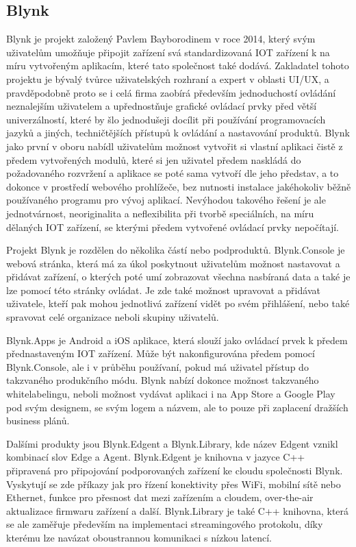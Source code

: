 \subsection{Blynk}

Blynk je projekt založený Pavlem Bayborodinem v roce 2014, který svým uživatelům umožňuje připojit zařízení svá standardizovaná IOT zařízení k na míru vytvořeným aplikacím, které tato společnost také dodává. Zakladatel tohoto projektu je bývalý tvůrce uživatelských rozhraní a expert v oblasti UI/UX, a pravděpodobně proto se i celá firma zaobírá především jednoduchostí ovládání neznalejším uživatelem a upřednostňuje grafické ovládací prvky před větší univerzálností, které by šlo jednodušeji docílit při používání programovacích jazyků a jiných, techničtějších přístupů k ovládání a nastavování produktů. Blynk jako první v oboru nabídl uživatelům možnost vytvořit si vlastní aplikaci čistě z předem vytvořených modulů, které si jen uživatel předem naskládá do požadovaného rozvržení a aplikace se poté sama vytvoří dle jeho představ, a to dokonce v prostředí webového prohlížeče, bez nutnosti instalace jakéhokoliv běžně používaného programu pro vývoj aplikací. Nevýhodou takového řešení je ale jednotvárnost, neoriginalita a neflexibilita při tvorbě speciálních, na míru dělaných IOT zařízení, se kterými předem vytvořené ovládací prvky nepočítají.

Projekt Blynk je rozdělen do několika částí nebo podproduktů. Blynk.Console je webová stránka, která má za úkol poskytnout uživatelům možnost nastavovat a přidávat zařízení, o kterých poté umí zobrazovat všechna nasbíraná data a také je lze pomocí této stránky ovládat. Je zde také možnost upravovat a přidávat uživatele, kteří pak mohou jednotlivá zařízení vidět po svém přihlášení, nebo také spravovat celé organizace neboli skupiny uživatelů. 

Blynk.Apps je Android a iOS aplikace, která slouží jako ovládací prvek k předem přednastaveným IOT zařízení. Může být nakonfigurována předem pomocí Blynk.Console, ale i v průběhu používaní, pokud má uživatel přístup do takzvaného produkčního módu. Blynk nabízí dokonce možnost takzvaného whitelabelingu, neboli možnost vydávat aplikaci i na App Store a Google Play pod svým designem, se svým logem a názvem, ale to pouze při zaplacení dražších business plánů.

Dalšími produkty jsou Blynk.Edgent a Blynk.Library, kde název Edgent vznikl kombinací slov Edge a Agent. Blynk.Edgent je knihovna v jazyce C++ připravená pro připojování podporovaných zařízení ke cloudu společnosti Blynk. Vyskytují se zde příkazy jak pro řízení konektivity přes WiFi, mobilní sítě nebo Ethernet, funkce pro přesnost dat mezi zařízením a cloudem, over-the-air aktualizace firmwaru zařízení a další. Blynk.Library je také C++ knihovna, která se ale zaměřuje především na implementaci streamingového protokolu, díky kterému lze navázat oboustrannou komunikaci s nízkou latencí. 

